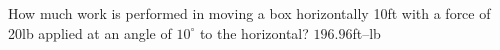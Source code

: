 {How much work is performed in moving a box horizontally 10ft with a force of 20lb applied at an angle of $10^\circ$ to the horizontal?
}
{$196.96$ft--lb
}
